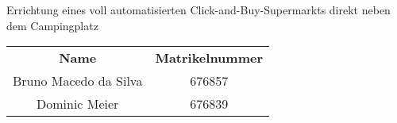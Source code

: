 \begin{titlepage}
    \vspace*{7cm}
    \begin{center}
        \Huge
        Errichtung eines voll automatisierten Click-and-Buy-Supermarkts direkt neben dem Campingplatz\\
        \vspace{1cm}
        \large
        \vspace{2cm}
         \begin {table}[ht]
             \centering
             \begin{tabular}{c|c}
                 \textbf{Name} & \textbf{Matrikelnummer} \\
                 Bruno Macedo da Silva & 676857 \\
                 Dominic Meier         & 676839 \\
             \end{tabular}
         \end {table}
    \end{center}
    \normalsize
    \vfill
 


\end{titlepage}